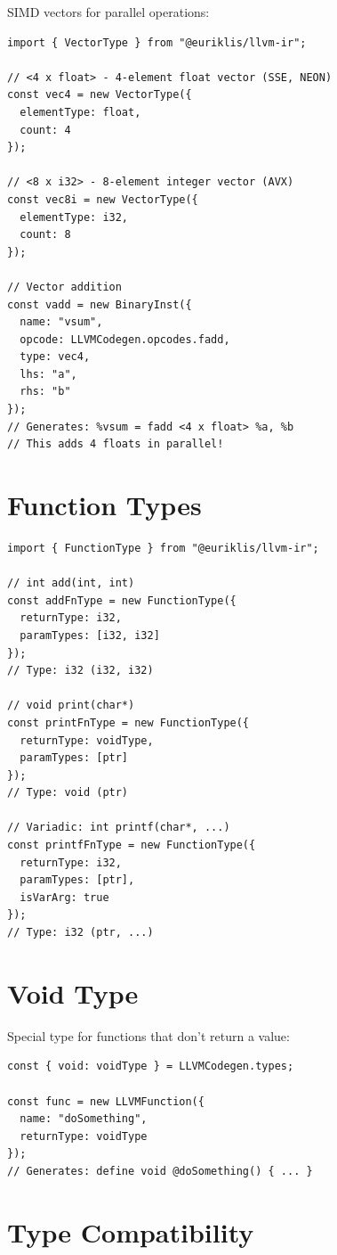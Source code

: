 \documentclass[11pt,oneside]{book}
\begin{document}
SIMD vectors for parallel operations:

\begin{lstlisting}[style=ts]
import { VectorType } from "@euriklis/llvm-ir";

// <4 x float> - 4-element float vector (SSE, NEON)
const vec4 = new VectorType({
  elementType: float,
  count: 4
});

// <8 x i32> - 8-element integer vector (AVX)
const vec8i = new VectorType({
  elementType: i32,
  count: 8
});

// Vector addition
const vadd = new BinaryInst({
  name: "vsum",
  opcode: LLVMCodegen.opcodes.fadd,
  type: vec4,
  lhs: "a",
  rhs: "b"
});
// Generates: %vsum = fadd <4 x float> %a, %b
// This adds 4 floats in parallel!
\end{lstlisting}

\section{Function Types}

\begin{lstlisting}[style=ts]
import { FunctionType } from "@euriklis/llvm-ir";

// int add(int, int)
const addFnType = new FunctionType({
  returnType: i32,
  paramTypes: [i32, i32]
});
// Type: i32 (i32, i32)

// void print(char*)
const printFnType = new FunctionType({
  returnType: voidType,
  paramTypes: [ptr]
});
// Type: void (ptr)

// Variadic: int printf(char*, ...)
const printfFnType = new FunctionType({
  returnType: i32,
  paramTypes: [ptr],
  isVarArg: true
});
// Type: i32 (ptr, ...)
\end{lstlisting}

\section{Void Type}

Special type for functions that don't return a value:

\begin{lstlisting}[style=ts]
const { void: voidType } = LLVMCodegen.types;

const func = new LLVMFunction({
  name: "doSomething",
  returnType: voidType
});
// Generates: define void @doSomething() { ... }
\end{lstlisting}

\section{Type Compatibility}
\end{document}
